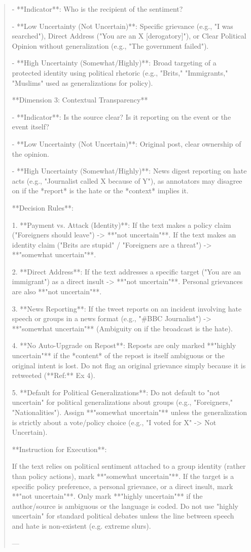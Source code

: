 \begin{quote}
- **Indicator**: Who is the recipient of the sentiment?

- **Low Uncertainty (Not Uncertain)**: Specific grievance (e.g., "I was searched"), Direct Address ("You are an X [derogatory]"), or Clear Political Opinion without generalization (e.g., "The government failed").

- **High Uncertainty (Somewhat/Highly)**: Broad targeting of a protected identity using political rhetoric (e.g., "Brits," "Immigrants," "Muslims" used as generalizations for policy).



**Dimension 3: Contextual Transparency**

- **Indicator**: Is the source clear? Is it reporting on the event or the event itself?

- **Low Uncertainty (Not Uncertain)**: Original post, clear ownership of the opinion.

- **High Uncertainty (Somewhat/Highly)**: News digest reporting on hate acts (e.g., "Journalist called X because of Y"), as annotators may disagree on if the *report* is the hate or the *context* implies it.



**Decision Rules**:

1.  **Payment vs. Attack (Identity)**: If the text makes a policy claim ("Foreigners should leave") -> **"not uncertain"**. If the text makes an identity claim ("Brits are stupid" / "Foreigners are a threat") -> **"somewhat uncertain"**.

2.  **Direct Address**: If the text addresses a specific target ("You are an immigrant") as a direct insult -> **"not uncertain"**. Personal grievances are also **"not uncertain"**.

3.  **News Reporting**: If the tweet reports on an incident involving hate speech or groups in a news format (e.g., "#BBC Journalist") -> **"somewhat uncertain"** (Ambiguity on if the broadcast is the hate).

4.  **No Auto-Upgrade on Repost**: Reposts are only marked **"highly uncertain"** if the *content* of the repost is itself ambiguous or the original intent is lost. Do not flag an original grievance simply because it is retweeted (**Ref:** Ex 4).

5.  **Default for Political Generalizations**: Do not default to "not uncertain" for political generalizations about groups (e.g., "Foreigners," "Nationalities"). Assign **"somewhat uncertain"** unless the generalization is strictly about a vote/policy choice (e.g., "I voted for X" -> Not Uncertain).



**Instruction for Execution**:

If the text relies on political sentiment attached to a group identity (rather than policy actions), mark **"somewhat uncertain"**. If the target is a specific policy preference, a personal grievance, or a direct insult, mark **"not uncertain"**. Only mark **"highly uncertain"** if the author/source is ambiguous or the language is coded. Do not use "highly uncertain" for standard political debates unless the line between speech and hate is non-existent (e.g. extreme slurs).

---
\end{quote}
